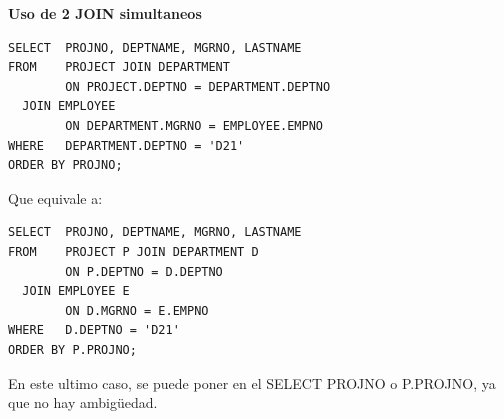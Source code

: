 \documentclass[8pt,a4paper,twocolumn]{article}
\begin{document}
\textbf{Uso de 2 JOIN simultaneos}
\begin{lstlisting}
SELECT  PROJNO, DEPTNAME, MGRNO, LASTNAME
FROM    PROJECT JOIN DEPARTMENT
        ON PROJECT.DEPTNO = DEPARTMENT.DEPTNO
  JOIN EMPLOYEE
        ON DEPARTMENT.MGRNO = EMPLOYEE.EMPNO
WHERE   DEPARTMENT.DEPTNO = 'D21'
ORDER BY PROJNO;
\end{lstlisting}
Que equivale a:
\begin{lstlisting}
SELECT  PROJNO, DEPTNAME, MGRNO, LASTNAME
FROM    PROJECT P JOIN DEPARTMENT D
        ON P.DEPTNO = D.DEPTNO
  JOIN EMPLOYEE E
        ON D.MGRNO = E.EMPNO
WHERE   D.DEPTNO = 'D21'
ORDER BY P.PROJNO;
\end{lstlisting}
En este ultimo caso, se puede poner en el SELECT PROJNO o P.PROJNO, ya que no hay ambigüedad.
\end{document}
